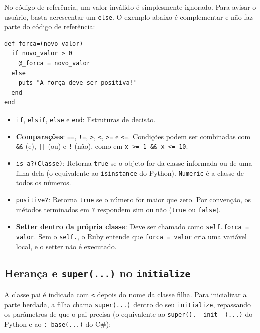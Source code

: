No código de referência, um valor inválido é simplesmente ignorado. Para avisar o usuário, basta
acrescentar um \texttt{else}. O exemplo abaixo é complementar e não faz parte do código de
referência:

\begin{lstlisting}[style=ruby]
def forca=(novo_valor)
  if novo_valor > 0
    @_forca = novo_valor
  else
    puts "A força deve ser positiva!"
  end
end
\end{lstlisting}

\begin{itemize}
    \item \texttt{if}, \texttt{elsif}, \texttt{else} e \texttt{end}: Estruturas de decisão.

    \item \textbf{Comparações}: \texttt{==}, \texttt{!=}, \texttt{>}, \texttt{<}, \texttt{>=} e
    \texttt{<=}. Condições podem ser combinadas com \texttt{\&\&} (e), \texttt{||} (ou) e
    \texttt{!} (não), como em \texttt{x >= 1 \&\& x <= 10}.

    \item \texttt{is\_a?(Classe)}: Retorna \texttt{true} se o objeto for da classe informada ou
    de uma filha dela (o equivalente ao \texttt{isinstance} do Python). \texttt{Numeric} é a
    classe de todos os números.

    \item \texttt{positive?}: Retorna \texttt{true} se o número for maior que zero. Por
    convenção, os métodos terminados em \texttt{?} respondem sim ou não (\texttt{true} ou
    \texttt{false}).

    \item \textbf{Setter dentro da própria classe}: Deve ser chamado como
    \texttt{self.forca = valor}. Sem o \texttt{self.}, o Ruby entende que
    \texttt{forca = valor} cria uma variável local, e o setter não é executado.
\end{itemize}

\subsection{Herança e \texttt{super(...)} no \texttt{initialize}}

A classe pai é indicada com \texttt{<} depois do nome da classe filha. Para inicializar a parte
herdada, a filha chama \texttt{super(...)} dentro do seu \texttt{initialize}, repassando os
parâmetros de que o pai precisa (o equivalente ao \texttt{super().\_\_init\_\_(...)} do Python e
ao \texttt{: base(...)} do C\#):

